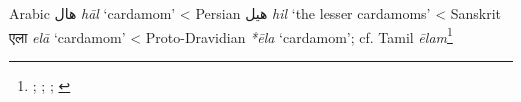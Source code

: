 \begin{etymology}\label{ety:hal}
Arabic {هال} \textit{hāl} `cardamom'
< Persian {هیل} \textit{hil} `the lesser cardamoms'
< Sanskrit {एला} \textit{elā} `cardamom'
< Proto-Dravidian \textit{*ēla} `cardamom'; cf. Tamil \textit{ēlam}\footnote{\textcite[1223]{wehr_dictionary_1976}; \textcite[1521]{steingass_comprehensive_1892}; \textcite[104]{dalby_dangerous_2000}; \textcite[87]{burrow_dravidian_1984}}
\end{etymology}